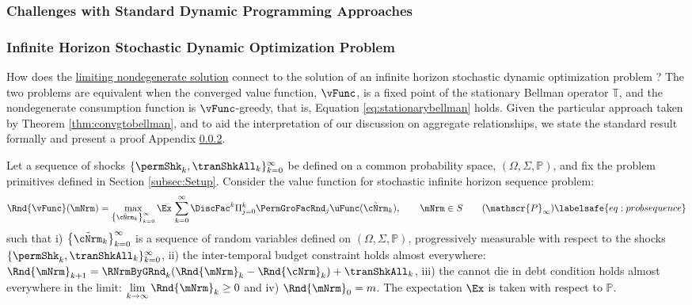 \documentclass[\econtexRoot/BufferStockTheory]{subfiles}
\begin{document}
\subsubsection{Challenges with Standard Dynamic Programming Approaches}\label{subsubsec:challenges}

\subsubsection{Infinite Horizon Stochastic Dynamic Optimization Problem}\label{subsubsec:infiniteSDPappx}

How does the  \hyperlink{Definition-of-a-Nondegenerate-Solution}{limiting nondegenerate solution} connect to the solution of an infinite horizon stochastic dynamic optimization problem \citep{hlermaSDS1995,puterman1994, stachurski2022}?
The two problems are equivalent when the converged value function, $\vFunc$, is a fixed point of the stationary Bellman operator $\mathbb{T}$, and the nondegenerate consumption function is $\vFunc$-greedy, that is,  Equation \eqref{eq:stationarybellman} holds.
Given the particular approach taken by Theorem \ref{thm:convgtobellman}, and to aid the interpretation of our discussion on aggregate relationships, we state the standard result formally and present a proof Appendix \ref{subsubsec:infiniteSDPappx}.


Let a sequence of shocks $\{\permShk_{k},\tranShkAll_{k}\}_{k=0}^{\infty}$ be defined on a common probability space, $(\Omega, \Sigma, \mathbb{P})$, and fix the problem primitives defined in Section \ref{subsec:Setup}.
Consider the value function for stochastic infinite horizon sequence problem:
%
\begin{equation}
\Rnd{\vFunc}(\mNrm) = \max_{\left\{\tilde{\cNrm}_{k}\right\}_{k=0}^{\infty}} \Ex\,\sum_{k=0}^{\infty}\DiscFac^{k}\Pi_{j=0}^{k}\PermGroFacRnd_{j}\uFunc(\tilde{\cNrm}_{k}), \qquad \mNrm\in S \tag{$\mathscr{P}_{\infty}$} \labelsafe{eq:probsequence}
\end{equation}
%
%
such that i) $\left\{\tilde{\cNrm}_{k}\right\}_{k=0}^{\infty}$ is a sequence of random variables defined on $(\Omega, \Sigma, \mathbb{P})$, progressively measurable with respect to the shocks $\{\permShk_{k},\tranShkAll_{k}\}_{k=0}^{\infty}$, ii) the inter-temporal budget constraint holds almost everywhere: $\Rnd{\mNrm}_{k+1} = \RNrmByGRnd_{k}(\Rnd{\mNrm}_{k} - \Rnd{\cNrm}_{k}) + \tranShkAll_{k}$, iii) the cannot die in debt condition holds almost everywhere in the limit: $\lim\limits_{k\rightarrow \infty}{\Rnd{\mNrm}_{k}}\geq 0$ and iv) $\Rnd{\mNrm}_{0} = m$.
The expectation $\Ex$ is taken with respect to $\mathbb{P}$.
\end{document}
